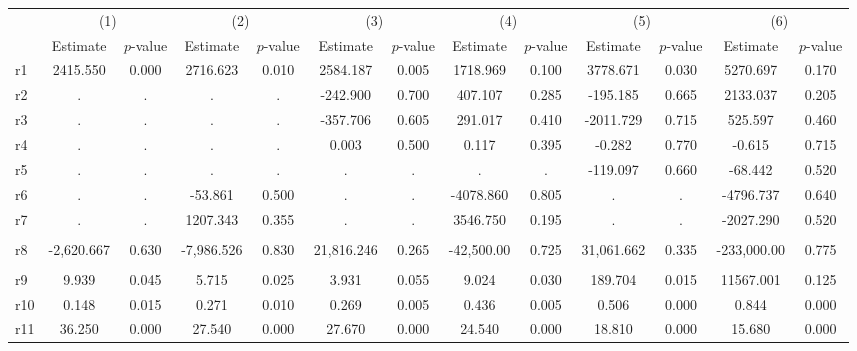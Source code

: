 \begin{tabular}{lcccccccccccc} \toprule
 & \multicolumn{2}{c}{(1)}  &  \multicolumn{2}{c}{(2)}  &  \multicolumn{2}{c}{(3)}  &  \multicolumn{2}{c}{(4)}  & \multicolumn{2}{c}{(5)} & \multicolumn{2}{c}{(6)} \\  
 & Estimate & $p$-value & Estimate & $p$-value & Estimate & $p$-value & Estimate & $p$-value & Estimate & $p$-value & Estimate & $p$-value \\ \midrule
r1 &  2415.550 &     0.000 &  2716.623 &     0.010 &  2584.187 &     0.005 &  1718.969 &     0.100 &  3778.671 &     0.030 &  5270.697 &     0.170 \\  
r2 &         . &         . &         . &         . &  -242.900 &     0.700 &   407.107 &     0.285 &  -195.185 &     0.665 &  2133.037 &     0.205 \\  
r3 &         . &         . &         . &         . &  -357.706 &     0.605 &   291.017 &     0.410 & -2011.729 &     0.715 &   525.597 &     0.460 \\  
r4 &         . &         . &         . &         . &     0.003 &     0.500 &     0.117 &     0.395 &    -0.282 &     0.770 &    -0.615 &     0.715 \\  
r5 &         . &         . &         . &         . &         . &         . &         . &         . &  -119.097 &     0.660 &   -68.442 &     0.520 \\  
r6 &         . &         . &   -53.861 &     0.500 &         . &         . & -4078.860 &     0.805 &         . &         . & -4796.737 &     0.640 \\  
r7 &         . &         . &  1207.343 &     0.355 &         . &         . &  3546.750 &     0.195 &         . &         . & -2027.290 &     0.520 \\  \\ \midrule
r8 & -2,620.667 &     0.630 & -7,986.526 &     0.830 & 21,816.246 &     0.265 & -42,500.00 &     0.725 & 31,061.662 &     0.335 & -233,000.00 &     0.775 \\  \\ \midrule
r9 &     9.939 &     0.045 &     5.715 &     0.025 &     3.931 &     0.055 &     9.024 &     0.030 &   189.704 &     0.015 & 11567.001 &     0.125 \\  
r10 &     0.148 &     0.015 &     0.271 &     0.010 &     0.269 &     0.005 &     0.436 &     0.005 &     0.506 &     0.000 &     0.844 &     0.000 \\  
r11 &    36.250 &     0.000 &    27.540 &     0.000 &    27.670 &     0.000 &    24.540 &     0.000 &    18.810 &     0.000 &    15.680 &     0.000 \\  
\hline \hline \end{tabular}
